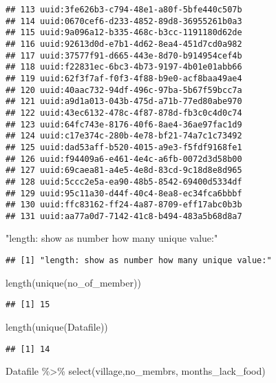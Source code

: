 \documentclass[
]{article}
\newenvironment{Shaded}{\begin{snugshade}}{\end{snugshade}}
\newcommand{\FunctionTok}[1]{\textcolor[rgb]{0.00,0.00,0.00}{#1}}
\newcommand{\NormalTok}[1]{#1}
\newcommand{\SpecialCharTok}[1]{\textcolor[rgb]{0.00,0.00,0.00}{#1}}
\newcommand{\StringTok}[1]{\textcolor[rgb]{0.31,0.60,0.02}{#1}}
\begin{document}
\begin{verbatim}
## 113 uuid:3fe626b3-c794-48e1-a80f-5bfe440c507b
## 114 uuid:0670cef6-d233-4852-89d8-36955261b0a3
## 115 uuid:9a096a12-b335-468c-b3cc-1191180d62de
## 116 uuid:92613d0d-e7b1-4d62-8ea4-451d7cd0a982
## 117 uuid:37577f91-d665-443e-8d70-b914954cef4b
## 118 uuid:f22831ec-6bc3-4b73-9197-4b01e01abb66
## 119 uuid:62f3f7af-f0f3-4f88-b9e0-acf8baa49ae4
## 120 uuid:40aac732-94df-496c-97ba-5b67f59bcc7a
## 121 uuid:a9d1a013-043b-475d-a71b-77ed80abe970
## 122 uuid:43ec6132-478c-4f87-878d-fb3c0c4d0c74
## 123 uuid:64fc743e-8176-40f6-8ae4-36ae97fac1d9
## 124 uuid:c17e374c-280b-4e78-bf21-74a7c1c73492
## 125 uuid:dad53aff-b520-4015-a9e3-f5fdf9168fe1
## 126 uuid:f94409a6-e461-4e4c-a6fb-0072d3d58b00
## 127 uuid:69caea81-a4e5-4e8d-83cd-9c18d8e8d965
## 128 uuid:5ccc2e5a-ea90-48b5-8542-69400d5334df
## 129 uuid:95c11a30-d44f-40c4-8ea8-ec34fca6bbbf
## 130 uuid:ffc83162-ff24-4a87-8709-eff17abc0b3b
## 131 uuid:aa77a0d7-7142-41c8-b494-483a5b68d8a7
\end{verbatim}

\begin{Shaded}
\begin{Highlighting}[]
\StringTok{"length: show as number how many unique value:"}
\end{Highlighting}
\end{Shaded}

\begin{verbatim}
## [1] "length: show as number how many unique value:"
\end{verbatim}

\begin{Shaded}
\begin{Highlighting}[]
\FunctionTok{length}\NormalTok{(}\FunctionTok{unique}\NormalTok{(no\_of\_member)) }
\end{Highlighting}
\end{Shaded}

\begin{verbatim}
## [1] 15
\end{verbatim}

\begin{Shaded}
\begin{Highlighting}[]
\FunctionTok{length}\NormalTok{(}\FunctionTok{unique}\NormalTok{(Datafile))}
\end{Highlighting}
\end{Shaded}

\begin{verbatim}
## [1] 14
\end{verbatim}

\begin{Shaded}
\begin{Highlighting}[]
\NormalTok{Datafile }\SpecialCharTok{\%\textgreater{}\%} 
  \FunctionTok{select}\NormalTok{(village,no\_membrs, months\_lack\_food)}
\end{Highlighting}
\end{Shaded}
\end{document}

